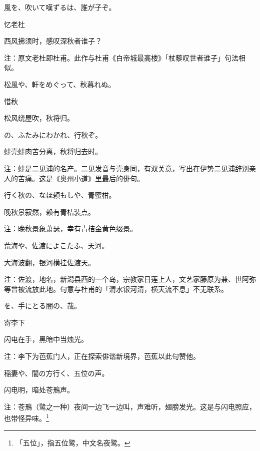 \begin{haiku}
    {\FH {}風を、吹いて嘆ずるは、誰が子ぞ。}

    {\FK 忆老杜}

    {\FK 西风拂须时，感叹深秋者谁子？}

    {\FT 注：原文老杜即杜甫。此作与杜甫《白帝城最高楼》「杖藜叹世者谁子」句法相似。}
\end{haiku}

\begin{haiku}
    {\FH 松風や、軒をめぐって、秋暮れぬ。}

    {\FK 惜秋}

    {\FK 松风绕屋吹，秋将归。}
\end{haiku}

\begin{haiku}
    {\FH {}の、ふたみにわかれ、行秋ぞ。}

    {\FK 蚌壳蚌肉苦分离，秋将归去时。}

    {\FT 注：蚌是二见浦的名产。二见发音与壳身同，有双关意，写出在伊势二见浦辞别亲人的苦痛。这是《奥州小道》里最后的俳句。}
\end{haiku}

\begin{haiku}
    {\FH 行く秋の、なほ頼もしや、青蜜柑。}

    {\FK 晚秋景寂然，赖有青桔装点。
    }

    {\FT 注：晚秋景象萧瑟，幸有青桔金黄色缀景。}
\end{haiku}

\begin{haiku}
    {\FH 荒海や、佐渡によこたふ、天河。}

    {\FK 大海波翻，银河横挂佐渡天。}

    {\FT 注：佐渡，地名，新潟县西的一个岛，宗教家日莲上人，文艺家藤原为兼、世阿弥等曾被流放此地。句意与杜甫的「渭水银河清，横天流不息」不无联系。}
\end{haiku}

\begin{haiku}
    {\FH {}を、手にとる闇の、哉。}

    {\FK 寄李下}

    {\FK 闪电在手，黑暗中当烛光。}

    {\FT 注：李下为芭蕉门人，正在探索俳谐新境界，芭蕉以此句赞他。}
\end{haiku}

\begin{haiku}
    {\FH 稲妻や、闇の方行く、五位の声。}

    {\FK 闪电明，暗处苍鳽声。}

    {\FT 注：苍鳽（鹭之一种）夜间一边飞一边叫，声难听，翅膀发光。这是与闪电照应，也带怪异味。\footnote{\FT 「五位」，指五位鹭，中文名夜鹭。}}
\end{haiku}

